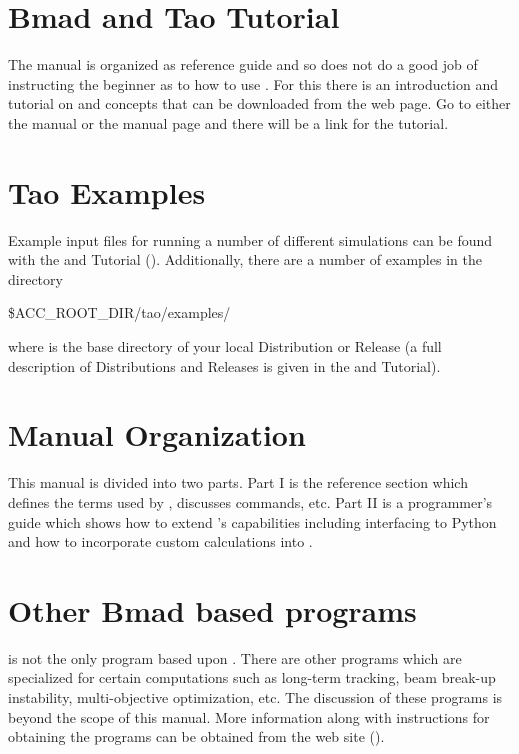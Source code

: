 \section{Bmad and Tao Tutorial}
\label{s:tutorial}

\vspace{0.1in} The \tao manual is organized as reference guide and so does not do a good job of
instructing the beginner as to how to use \tao. For this there is an introduction and tutorial on
\bmad and \tao concepts that can be downloaded from the \bmad web page. Go to either the \bmad
manual or the \tao manual page and there will be a link for the tutorial.

\section{Tao Examples}
\label{s:examples}

Example input files for running a number of different simulations can be found with the \bmad and \tao
Tutorial (). Additionally, there are a number of examples in the directory
\begin{example}
  \$ACC_ROOT_DIR/tao/examples/
\end{example}
where  is the base directory of your local \bmad Distribution or Release (a full description
of \bmad Distributions and Releases is given in the \bmad and \tao Tutorial).

\section{Manual Organization}

This manual is divided into two parts. Part I is the reference section which defines the terms used
by \tao, discusses \tao commands, etc. Part II is a programmer's guide which shows how to extend
\tao's capabilities including interfacing to Python and how to incorporate custom calculations into
\tao.

\section{Other Bmad based programs}
\label{s:other}

\tao is not the only program based upon \bmad. There are other programs which are specialized for
certain computations such as long-term tracking, beam break-up instability, multi-objective
optimization, etc. The discussion of these programs is beyond the scope of this manual. More
information along with instructions for obtaining the programs can be obtained from the \bmad web site ().

